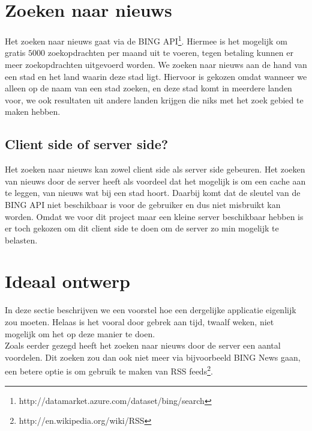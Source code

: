 \documentclass[twoside,openright]{uva-bachelor-thesis}
\begin{document}
	\section{Zoeken naar nieuws}
		Het zoeken naar nieuws gaat via de BING API\footnote{http://datamarket.azure.com/dataset/bing/search}. Hiermee is het mogelijk om gratis $5000$ zoekopdrachten per maand uit te voeren, tegen betaling kunnen er meer zoekopdrachten uitgevoerd worden. We zoeken naar nieuws aan de hand van een stad en het land waarin deze stad ligt. Hiervoor is gekozen omdat wanneer we alleen op de naam van een stad zoeken, en deze stad komt in meerdere landen voor, we ook resultaten uit andere landen krijgen die niks met het zoek gebied te maken hebben. 
		\subsection{Client side of server side?}
			Het zoeken naar nieuws kan zowel client side als server side gebeuren.
			Het zoeken van nieuws door de server heeft als voordeel dat het mogelijk is om een cache aan te leggen, van nieuws wat bij een stad hoort. Daarbij komt dat de sleutel van de BING API niet beschikbaar is voor de gebruiker en dus niet misbruikt kan worden. 
			Omdat we voor dit project maar een kleine server beschikbaar hebben is er toch gekozen om dit client side te doen om de server zo min mogelijk te belasten.
	\section{Ideaal ontwerp}
		In deze sectie beschrijven we een voorstel hoe een dergelijke applicatie eigenlijk zou moeten. Helaas is het vooral door gebrek aan tijd, twaalf weken, niet mogelijk om het op deze manier te doen. 
		\\[0.5cm]
		Zoals eerder gezegd heeft het zoeken naar nieuws door de server een aantal voordelen. Dit zoeken zou dan ook niet meer via bijvoorbeeld BING News gaan, een betere optie is om gebruik te maken van RSS feeds\footnote{http://en.wikipedia.org/wiki/RSS}.
\end{document}
